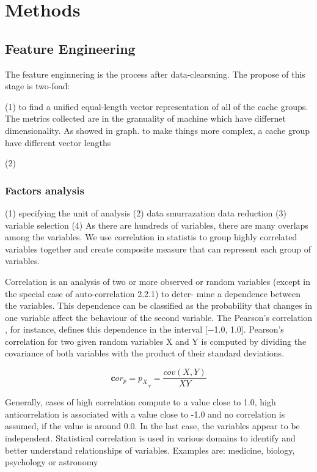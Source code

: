 \documentclass[review]{elsarticle}
\begin{document}
\section{Methods}
\subsection{Feature Engineering}
The feature enginnering is the process after data-clearsning. The propose of this stage is two-foad:

(1) to find a unified equal-length vector representation of all of the cache groups. 
The metrics collected are in the granuality of machine which have differnet dimensionality. As showed in graph. to make things more complex, a cache group have different vector lengths 

(2) 
\subsubsection{Factors analysis}
(1) specifying the unit of analysis (2) data smurrazation data reduction (3) variable selection (4) 
As there are hundreds of variables, there are many overlaps among the variables. We use correlation in statistis to group highly correlated variables together and create composite measure that can represent each group of variables.

Correlation is an analysis of two or more observed or random variables (except in the special case of auto-correlation 2.2.1) to deter- mine a dependence between the variables. This dependence can be classified as the probability that changes in one variable affect the behaviour of the second variable. The Pearson’s correlation , for instance, defines this dependence in the interval [−1.0, 1.0]. Pearson’s correlation for two given random variables X and Y is computed by dividing the covariance of both variables with the product of their standard deviations.

\begin{equation}
	\mathbf cor_p=p_X_,_Y = \frac{cov(X,Y)}{XY}
\end{equation}

Generally, cases of high correlation compute to a value close to 1.0, high anticorrelation is associated with a value close to -1.0 and no correlation is assumed, if the value is around 0.0. In the last case, the variables appear to be independent. Statistical correlation is used in various domains to identify and better understand relationships of variables. Examples are: medicine, biology, psychology or astronomy
\end{document}
